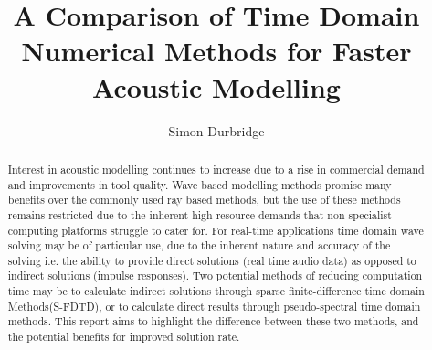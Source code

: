 \documentclass{svproc}
\title{A Comparison of Time Domain Numerical Methods for Faster Acoustic Modelling} %
\author{Simon Durbridge} %
\institute{Dept. Engineering, Mathematics \&\ Computing\\ University of Derby\\
\email{s.durbridge1@unimail.derby.ac.uk} %
} %
\begin{document}
\maketitle %


\begin{abstract}
Interest in acoustic modelling continues to increase due to a rise in commercial demand and improvements in tool quality. Wave based modelling methods promise many benefits over the commonly used ray based methods, but the use of these methods remains restricted due to the inherent high resource demands that non-specialist computing platforms struggle to cater for. For real-time applications time domain wave solving may be of particular use, due to the inherent nature and accuracy of the solving i.e. the ability to provide direct solutions (real time audio data) as opposed to indirect solutions (impulse responses). Two potential methods of reducing computation time may be to calculate indirect solutions through sparse finite-difference time domain Methods(S-FDTD), or to calculate direct results through pseudo-spectral time domain methods. This report aims to highlight the difference between these two methods, and the potential benefits for improved solution rate. 


\end{abstract}




\tableofcontents



\listoffigures




\end{document}
